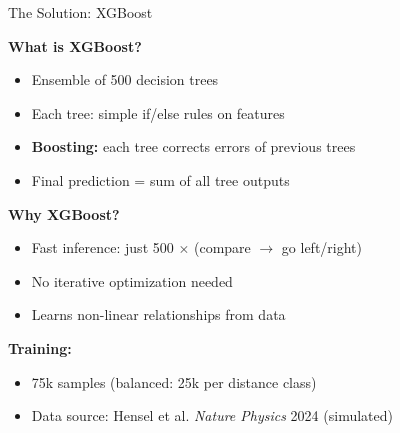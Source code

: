 \documentclass[aspectratio=169]{beamer}
\begin{document}
\begin{frame}{The Solution: XGBoost}

    \textbf{What is XGBoost?}
    \begin{itemize}
        \item Ensemble of 500 decision trees
        \item Each tree: simple if/else rules on features
        \item \textbf{Boosting:} each tree corrects errors of previous trees
        \item Final prediction = sum of all tree outputs
    \end{itemize}

    \vspace{0.5cm}

    \textbf{Why XGBoost?}
    \begin{itemize}
        \item Fast inference: just 500 $\times$ (compare $\rightarrow$ go left/right)
        \item No iterative optimization needed
        \item Learns non-linear relationships from data
    \end{itemize}

    \vspace{0.5cm}

    \textbf{Training:}
    \begin{itemize}
        \item 75k samples (balanced: 25k per distance class)
        \item Data source: Hensel et al. \textit{Nature Physics} 2024 (simulated)
    \end{itemize}

\end{frame}
\end{document}
